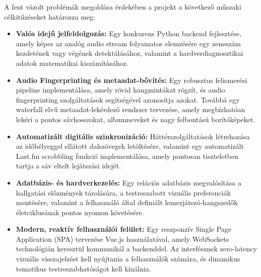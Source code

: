 A fent vázolt problémák megoldása érdekében a projekt a következő műszaki célkitűzéseket határozza meg:
\begin{itemize}
    \item \textbf{Valós idejű jelfeldolgozás:} Egy konkurens Python backend fejlesztése, amely képes az analóg audio stream folyamatos elemzésére egy zeneszám kezdetének vagy végének detektálásához, valamint a hardverdiagnosztikai adatok matematikai kiszámításához.
    \item \textbf{Audio Fingerprinting és metaadat-bővítés:} Egy robusztus felismerési pipeline implementálása, amely rövid hangmintákat rögzít, és audio fingerprinting szolgáltatások segítségével azonosítja azokat. Továbbá egy waterfall elvű metaadat-lekérdező rendszer tervezése, amely megbízhatóan lekéri a pontos sávhosszokat, albumneveket és nagy felbontású borítóképeket.
    \item \textbf{Automatizált digitális szinkronizáció:} Háttérszolgáltatások létrehozása az időbélyeggel ellátott dalszövegek letöltésére, valamint egy automatizált Last.fm scrobbling funkció implementálása, amely pontosan tiszteletben tartja a sáv eltelt lejátszási idejét.
    \item \textbf{Adatbázis- és hardverkezelés:} Egy relációs adatbázis megvalósítása a hallgatási előzmények tárolására, a testreszabott vizuális preferenciák mentésére, valamint a felhasználó által definiált lemezjátszó-hangszedők életciklusának pontos nyomon követésére.
    \item \textbf{Modern, reaktív felhasználói felület:} Egy reszponzív Single Page Application (SPA) tervezése Vue.js használatával, amely WebSockets technológián keresztül kommunikál a backenddel. Az interfésznek zero-latency vizuális visszajelzést kell nyújtania a felhasználók számára, és dinamikus tematikus testreszabhatóságot kell kínálnia.
\end{itemize}